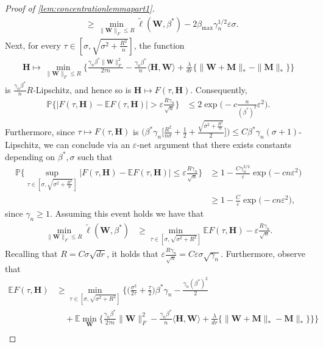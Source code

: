\documentclass[10pt]{article}
\newcommand{\eps}{\ensuremath{\varepsilon}}
\newcommand{\s}{^*}
\newcommand{\p}{\mathbb{P}}
\renewcommand{\tilde}{\widetilde}
\theoremstyle{definition}
\begin{document}
\begin{proof}[Proof of \cref{lem:concentrationlemmapart1}]
\begin{align}
    &\geq \min_{\|\bm{W}\|_F \leq R }\tilde \ell(\bm{W},\beta\s) - 2\beta_{\max} \gamma_n^{1/2} \eps \sigma. 
\end{align}
Next, for every $\tau \in [\sigma ,\sqrt{\sigma^2 + \frac{R^2}{n}}]$, the function
\begin{align}
    \bm{H} \mapsto \min_{\|\bm{W}\|_F \leq R} \bigg\{\frac{\gamma_n \beta\s\|\bm{W}\|_F^2}{2\tau n} - \frac{\gamma_n \beta\s}{n} \langle \bm{H},\bm{W} \rangle + \frac{\lambda}{dr} \{ \|\bm{W} + \bm{M} \|_* - \| \bm{M} \|_* \} \bigg\}
\end{align}
is $\frac{\gamma_n \beta\s}{n} R$-Lipschitz, and hence so is $\bm{H} \mapsto F(\tau,\bm{H})$.  Consequently, 
\begin{align}
    \p\bigg\{ \bigg| F(\tau,\bm{H}) - \mathbb{E} F(\tau,\bm{H}) \bigg| > \eps \frac{R \gamma_n}{\sqrt{n}} \bigg\} &\leq 2 \exp\bigg( - c \frac{n}{( \beta\s)^2} \eps^2 \bigg).
\end{align}
Furthermore, since $\tau \mapsto F(\tau,\bm{H})$ is $\big(\beta\s \gamma_n \big[ \frac{R^2}{n \sigma} + \frac{1}{2} + \frac{\sqrt{\sigma^2 + \frac{R^2}{n}}}{2}\big] \big) \leq C \beta\s \gamma_n (\sigma + 1)$-Lipschitz, we can conclude via an $\eps$-net argument that there exists constants depending on $\beta\s,\sigma$ such that
\begin{align}
    \p\bigg\{ \sup_{\tau \in [\sigma, \sqrt{\sigma^2 + \frac{R^2}{n}}]} \bigg| F(\tau,\bm{H}) - \mathbb{E}F(\tau,\bm{H}) \bigg| \leq  \eps \frac{R \gamma_n}{\sqrt{n}} \bigg\} &\geq 1 - \frac{C \gamma_n^{3/2}}{\eps } \exp\bigg( - c n\eps^2 \bigg) \\
    &\geq 1 - \frac{C}{\eps } \exp\bigg( - c  n \eps^2 \bigg),
\end{align}
since $\gamma_n \geq 1$.  Assuming this event holds we have that
\begin{align}
    \min_{\|\bm{W}\|_F \leq R} \tilde \ell(\bm{W},\beta\s) &\geq \min_{\tau\in [ \sigma,\sqrt{\sigma^2 + R^2}]} \mathbb{E} F(\tau,\bm{H}) - \eps \frac{R\gamma_n}{\sqrt{n}}.
\end{align}
Recalling that $R = C \sigma \sqrt{dr}$, it holds that $\eps \frac{R \gamma_n}{\sqrt{n}} =C \eps \sigma \sqrt{\gamma_n}$.  Furthermore, observe that 
\begin{align}
    \mathbb{E} F(\tau,\bm{H}) &\geq  \min_{\tau \in [\sigma ,\sqrt{\sigma^2 + R^2}]}  \bigg\{ \bigg( \frac{\sigma^2}{2\tau} + \frac{\tau}{2} \bigg) \beta\s \gamma_n - \frac{\gamma_n(\beta\s)^2}{2}\\
    &\quad +  \mathbb{E} \min_{\bm{W}} \bigg\{ \frac{\gamma_n\beta\s}{2\tau n} \| \bm{W}\|_F^2 - \frac{\gamma_n\beta\s}{n} \langle \bm{H,W} \rangle + \frac{\lambda}{dr} \big\{ \| \bm{W} + \bm{M}\|_* - \bm{M}\|_*\big\} \bigg\} \bigg\} \\

\end{align}
\end{proof}
\end{document}
